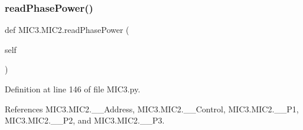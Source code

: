 \mbox{\label{class_m_i_c3_1_1_m_i_c2_a028b7ceca700f09e99db7f559224a914}} 
\subsubsection{\texorpdfstring{read\+Phase\+Power()}{readPhasePower()}}
{\footnotesize\ttfamily def M\+I\+C3.\+M\+I\+C2.\+read\+Phase\+Power (\begin{DoxyParamCaption}\item[{}]{self }\end{DoxyParamCaption})}



Definition at line 146 of file M\+I\+C3.\+py.



References M\+I\+C3.\+M\+I\+C2.\+\_\+\+\_\+\+Address, M\+I\+C3.\+M\+I\+C2.\+\_\+\+\_\+\+Control, M\+I\+C3.\+M\+I\+C2.\+\_\+\+\_\+\+P1, M\+I\+C3.\+M\+I\+C2.\+\_\+\+\_\+\+P2, and M\+I\+C3.\+M\+I\+C2.\+\_\+\+\_\+\+P3.


